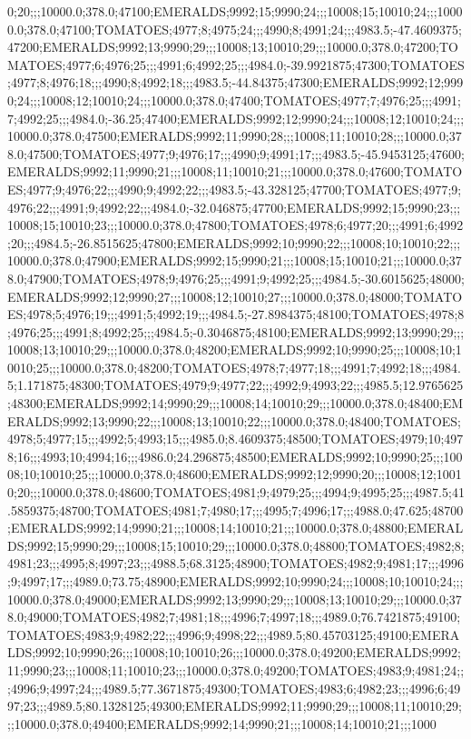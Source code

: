 0;20;;;10000.0;378.0;47100;EMERALDS;9992;15;9990;24;;;10008;15;10010;24;;;10000.0;378.0;47100;TOMATOES;4977;8;4975;24;;;4990;8;4991;24;;;4983.5;-47.4609375;47200;EMERALDS;9992;13;9990;29;;;10008;13;10010;29;;;10000.0;378.0;47200;TOMATOES;4977;6;4976;25;;;4991;6;4992;25;;;4984.0;-39.9921875;47300;TOMATOES;4977;8;4976;18;;;4990;8;4992;18;;;4983.5;-44.84375;47300;EMERALDS;9992;12;9990;24;;;10008;12;10010;24;;;10000.0;378.0;47400;TOMATOES;4977;7;4976;25;;;4991;7;4992;25;;;4984.0;-36.25;47400;EMERALDS;9992;12;9990;24;;;10008;12;10010;24;;;10000.0;378.0;47500;EMERALDS;9992;11;9990;28;;;10008;11;10010;28;;;10000.0;378.0;47500;TOMATOES;4977;9;4976;17;;;4990;9;4991;17;;;4983.5;-45.9453125;47600;EMERALDS;9992;11;9990;21;;;10008;11;10010;21;;;10000.0;378.0;47600;TOMATOES;4977;9;4976;22;;;4990;9;4992;22;;;4983.5;-43.328125;47700;TOMATOES;4977;9;4976;22;;;4991;9;4992;22;;;4984.0;-32.046875;47700;EMERALDS;9992;15;9990;23;;;10008;15;10010;23;;;10000.0;378.0;47800;TOMATOES;4978;6;4977;20;;;4991;6;4992;20;;;4984.5;-26.8515625;47800;EMERALDS;9992;10;9990;22;;;10008;10;10010;22;;;10000.0;378.0;47900;EMERALDS;9992;15;9990;21;;;10008;15;10010;21;;;10000.0;378.0;47900;TOMATOES;4978;9;4976;25;;;4991;9;4992;25;;;4984.5;-30.6015625;48000;EMERALDS;9992;12;9990;27;;;10008;12;10010;27;;;10000.0;378.0;48000;TOMATOES;4978;5;4976;19;;;4991;5;4992;19;;;4984.5;-27.8984375;48100;TOMATOES;4978;8;4976;25;;;4991;8;4992;25;;;4984.5;-0.3046875;48100;EMERALDS;9992;13;9990;29;;;10008;13;10010;29;;;10000.0;378.0;48200;EMERALDS;9992;10;9990;25;;;10008;10;10010;25;;;10000.0;378.0;48200;TOMATOES;4978;7;4977;18;;;4991;7;4992;18;;;4984.5;1.171875;48300;TOMATOES;4979;9;4977;22;;;4992;9;4993;22;;;4985.5;12.9765625;48300;EMERALDS;9992;14;9990;29;;;10008;14;10010;29;;;10000.0;378.0;48400;EMERALDS;9992;13;9990;22;;;10008;13;10010;22;;;10000.0;378.0;48400;TOMATOES;4978;5;4977;15;;;4992;5;4993;15;;;4985.0;8.4609375;48500;TOMATOES;4979;10;4978;16;;;4993;10;4994;16;;;4986.0;24.296875;48500;EMERALDS;9992;10;9990;25;;;10008;10;10010;25;;;10000.0;378.0;48600;EMERALDS;9992;12;9990;20;;;10008;12;10010;20;;;10000.0;378.0;48600;TOMATOES;4981;9;4979;25;;;4994;9;4995;25;;;4987.5;41.5859375;48700;TOMATOES;4981;7;4980;17;;;4995;7;4996;17;;;4988.0;47.625;48700;EMERALDS;9992;14;9990;21;;;10008;14;10010;21;;;10000.0;378.0;48800;EMERALDS;9992;15;9990;29;;;10008;15;10010;29;;;10000.0;378.0;48800;TOMATOES;4982;8;4981;23;;;4995;8;4997;23;;;4988.5;68.3125;48900;TOMATOES;4982;9;4981;17;;;4996;9;4997;17;;;4989.0;73.75;48900;EMERALDS;9992;10;9990;24;;;10008;10;10010;24;;;10000.0;378.0;49000;EMERALDS;9992;13;9990;29;;;10008;13;10010;29;;;10000.0;378.0;49000;TOMATOES;4982;7;4981;18;;;4996;7;4997;18;;;4989.0;76.7421875;49100;TOMATOES;4983;9;4982;22;;;4996;9;4998;22;;;4989.5;80.45703125;49100;EMERALDS;9992;10;9990;26;;;10008;10;10010;26;;;10000.0;378.0;49200;EMERALDS;9992;11;9990;23;;;10008;11;10010;23;;;10000.0;378.0;49200;TOMATOES;4983;9;4981;24;;;4996;9;4997;24;;;4989.5;77.3671875;49300;TOMATOES;4983;6;4982;23;;;4996;6;4997;23;;;4989.5;80.1328125;49300;EMERALDS;9992;11;9990;29;;;10008;11;10010;29;;;10000.0;378.0;49400;EMERALDS;9992;14;9990;21;;;10008;14;10010;21;;;1000